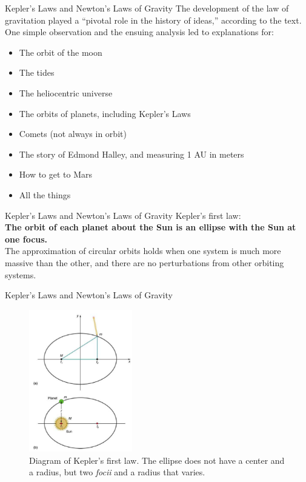 \documentclass{beamer}
\begin{document}
\begin{frame}{Kepler's Laws and Newton's Laws of Gravity}
The development of the law of gravitation played a ``pivotal role in the history of ideas,'' according to the text.  One simple observation and the ensuing analysis led to explanations for: \\
\begin{itemize}
\item The orbit of the moon
\item The tides
\item The \alert{heliocentric universe}
\item The orbits of planets, including Kepler's Laws
\item Comets (not always in orbit)
\item The story of Edmond Halley, and measuring 1 AU in meters
\item How to get to Mars
\item All the things
\end{itemize}
\end{frame}

\begin{frame}{Kepler's Laws and Newton's Laws of Gravity}
Kepler's first law: \\
\vspace{0.5cm}
\textbf{The orbit of each planet about the Sun is an ellipse with the Sun at one focus.} \\
\vspace{0.5cm}
The approximation of circular orbits holds when one system is much more massive than the other, and there are no perturbations from other orbiting systems.
\end{frame}

\begin{frame}{Kepler's Laws and Newton's Laws of Gravity}
\begin{figure}
\centering
\includegraphics[width=0.4\textwidth]{figures/kepler1.png}
\caption{\label{fig:kepler1} Diagram of Kepler's first law.  The ellipse does not have a center and a radius, but two \textit{focii} and a radius that varies.}
\end{figure}
\end{frame}
\end{document}
